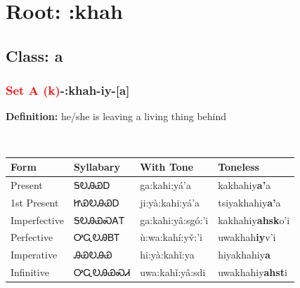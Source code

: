 \needspace{4in}
\section*{Root: :khah}
\nopagebreak
{}
\needspace{3in}
\subsection*{Class: a}
\nopagebreak
\needspace{2in}
\subsubsection*{\textcolor{Red}{Set A (k)}{-}\textbf{:khah}{-}iy{-}[a]}
\nopagebreak
\textbf{Definition: } he/she is leaving a living thing behind
\\[0.5em]
\begin{tabularx}{\textwidth}{l X X X}%
\toprule%
\textbf{Form}&\textbf{Syllabary}&\textbf{With Tone}&\textbf{Toneless}\\%
\midrule%
Present&ᎦᎧᎯᏯᎠ&ga:kahi:yá’a&kakhahiy\textbf{a'}a\\%
1st Present&ᏥᏯᎧᎯᏯᎠ&ji:yà:kahi:yá’a&tsiyakhahiy\textbf{a'}a\\%
Imperfective&ᎦᎧᎯᏯᏍᎪᎢ&ga:kahi:yâ:sgó:’i&kakhahiy\textbf{ahsk}o'i\\%
Perfective&ᎤᏩᎧᎯᏴᎢ&ù:wa:kahí:yv̌:’i&uwakhah\textbf{iy}v'i\\%
Imperative&ᎯᏯᎧᎯᏯ&hi:yà:kahǐ:ya&hiyakhahiy\textbf{a}\\%
Infinitive&ᎤᏩᎧᎯᏯᏍᏗ&uwa:kahǐ:yâ:sdi&uwakhahiy\textbf{ahst}i\\%
\bottomrule%
\end{tabularx}
\\[1em]